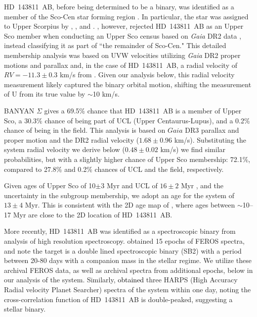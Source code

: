 \documentclass[]{aastex701} %
\begin{document}
HD~143811~AB, before being determined to be a binary, was identified as a member of the Sco-Cen star forming region \citep{dezeeuw:1999}. In particular, the star was assigned to Upper Scorpius by \citet{dezeeuw:1999}, \citet{pecaut:2012}, and \citet{galli:2018}. \citet{luhman:2020}, however, rejected HD~143811~AB as an Upper Sco member when conducting an Upper Sco census based on \textit{Gaia} DR2 data \citep{gaiadr2}, instead classifying it as part of ``the remainder of Sco-Cen." This detailed membership analysis was based on UVW velocities utilizing \textit{Gaia} DR2 proper motions and parallax and, in the case of HD~143811~AB, a radial velocity of $RV = -11.3 \pm 0.3$ km/s from \citet{chen:2011}. Given our analysis below, this radial velocity measurement likely captured the binary orbital motion, shifting the measurement of U from its true value by $\sim$10 km/s.

BANYAN $\Sigma$ \citep{gagne:2018} gives a 69.5\% chance that HD~143811~AB is a member of Upper Sco, a 30.3\% chance of being part of UCL (Upper Centaurus-Lupus), and a 0.2\% chance of being in the field. This analysis is based on $Gaia$ DR3 \citep{GaiaDR3} parallax and proper motion and the DR2 \citep{gaiadr2} radial velocity ($1.68 \pm 0.96$ km/s). Substituting the system radial velocity we derive below ($0.48 \pm 0.02$ km/s) we find similar probabilities, but with a slightly higher chance of Upper Sco membership: 72.1\%, compared to 27.8\% and 0.2\% chances of UCL and the field, respectively.

Given ages of Upper Sco of 10$\pm$3 Myr and UCL of $16 \pm 2$ Myr \citep{pecaut:2012}, and the uncertainty in the subgroup membership, we adopt an age for the system of $13 \pm 4$ Myr. This is consistent with the 2D age map of \citet{pecaut:2016}, where ages between $\sim$10--17 Myr are close to the 2D location of HD~143811~AB.

More recently, HD~143811~AB was identified as a spectroscopic binary from analysis of high resolution spectroscopy. \citet{zakhozhay:2022} obtained 15 epochs of FEROS spectra, and note the target is a double lined spectroscopic binary (SB2) with a period between 20-80 days with a companion mass in the stellar regime. We utilize these archival FEROS data, as well as archival spectra from additional epochs, below in our analysis of the system. Similarly, \citet{grandjean:2023} \textcolor{black}{obtained} three HARPS (High Accuracy Radial velocity Planet Searcher) spectra of the system within one day, noting the cross-correlation function of HD~143811~AB is double-peaked, suggesting a stellar binary.
\end{document}
